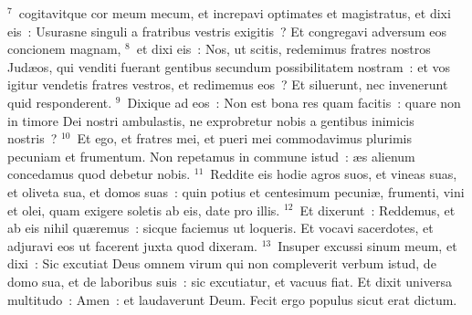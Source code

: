 ${}^{7}$~cogitavitque cor meum mecum, et increpavi optimates et magistratus, et dixi eis~: Usurasne singuli a fratribus vestris exigitis~? Et congregavi adversum eos concionem magnam,
${}^{8}$~et dixi eis~: Nos, ut scitis, redemimus fratres nostros Jud\ae os, qui venditi fuerant gentibus secundum possibilitatem nostram~: et vos igitur vendetis fratres vestros, et redimemus eos~? Et siluerunt, nec invenerunt quid responderent.
${}^{9}$~Dixique ad eos~: Non est bona res quam facitis~: quare non in timore Dei nostri ambulastis, ne exprobretur nobis a gentibus inimicis nostris~?
${}^{10}$~Et ego, et fratres mei, et pueri mei commodavimus plurimis pecuniam et frumentum. Non repetamus in commune istud~: \ae s alienum concedamus quod debetur nobis.
${}^{11}$~Reddite eis hodie agros suos, et vineas suas, et oliveta sua, et domos suas~: quin potius et centesimum pecuni\ae , frumenti, vini et olei, quam exigere soletis ab eis, date pro illis.
${}^{12}$~Et dixerunt~: Reddemus, et ab eis nihil qu\ae remus~: sicque faciemus ut loqueris. Et vocavi sacerdotes, et adjuravi eos ut facerent juxta quod dixeram.
${}^{13}$~Insuper excussi sinum meum, et dixi~: Sic excutiat Deus omnem virum qui non compleverit verbum istud, de domo sua, et de laboribus suis~: sic excutiatur, et vacuus fiat. Et dixit universa multitudo~: Amen~: et laudaverunt Deum. Fecit ergo populus sicut erat dictum.



